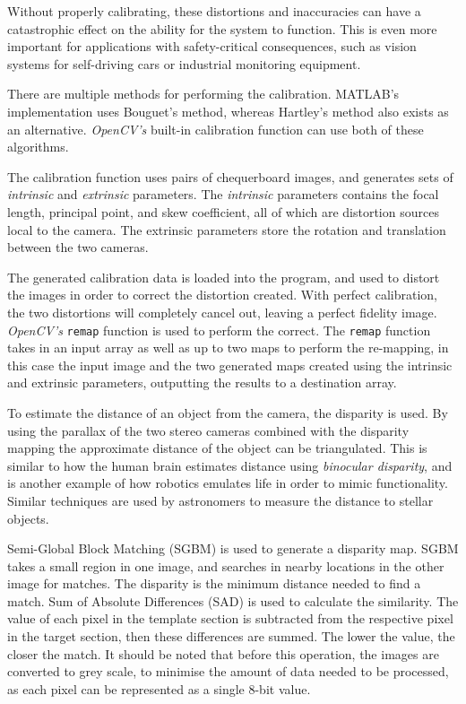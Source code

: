 \documentclass[conference]{IEEEtran}
\begin{document}
Without properly calibrating, these distortions and inaccuracies can have a catastrophic effect on the ability for the system to function. This is even more important for applications with safety-critical consequences, such as vision systems for self-driving cars\cite{Bosch} or industrial monitoring equipment\cite{Intel}.

There are multiple methods for performing the calibration. MATLAB's implementation uses Bouguet's method\cite{MATLAB_Calibration}\cite{Bouguet}, whereas Hartley's method\cite{hartley2003multiple} also exists as an alternative. \textit{OpenCV's} built-in calibration function can use both of these algorithms\cite{Book_Calibration}.

The calibration function uses pairs of chequerboard images, and generates sets of \textit{intrinsic} and \textit{extrinsic} parameters. The \textit{intrinsic} parameters contains the focal length, principal point, and skew coefficient, all of which are distortion sources local to the camera. The extrinsic parameters store the rotation and translation between the two cameras. 

The generated calibration data is loaded into the program, and used to distort the images in order to correct the distortion created. With perfect calibration, the two distortions will completely cancel out, leaving a perfect fidelity image. \textit{OpenCV's} \verb|remap|\cite{remap} function is used to perform the correct. The \verb|remap| function takes in an input array as well as up to two maps to perform the re-mapping, in this case the input image and the two generated maps created using the intrinsic and extrinsic parameters, outputting the results to a destination array\cite{remap_docs}.

To estimate the distance of an object from the camera, the disparity is used. By using the parallax of the two stereo cameras combined with the disparity mapping the approximate distance of the object can be triangulated. This is similar to how the human brain estimates distance using \textit{binocular disparity}\cite{10.3389/fpsyg.2014.00870}\cite{BERRYHILL2012525}, and is another example of how robotics emulates life in order to mimic functionality. Similar techniques are used by astronomers to measure the distance to stellar objects\cite{parallax}.

Semi-Global Block Matching (SGBM) is used to generate a disparity map. SGBM takes a small region in one image, and searches in nearby locations in the other image for matches. The disparity is the minimum distance needed to find a match. Sum of Absolute Differences (SAD) is used to calculate the similarity\cite{StereoBlockMatching}. The value of each pixel in the template section is subtracted from the respective pixel in the target section, then these differences are summed. The lower the value, the closer the match. It should be noted that before this operation, the images are converted to grey scale, to minimise the amount of data needed to be processed, as each pixel can be represented as a single 8-bit value.
\end{document}
